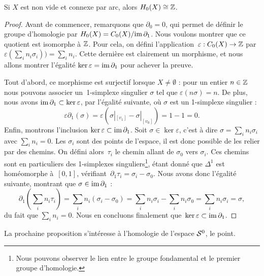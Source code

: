 \begin{proposition}
Si $X$ est non vide et connexe par arc, alors $H_0(X)\cong\mathbb{Z}$.
\end{proposition}
\begin{proof}
Avant de commencer, remarquons que $\partial_0=0$, qui permet de définir le groupe d'homologie par $H_0(X)=C_0(X)/\mathrm{im}\,\partial_1$. Nous voulons montrer que ce quotient est isomorphe à $\mathbb{Z}$. Pour cela, on défini l'application~${\varepsilon:C_0(X)\to \mathbb{Z}}$ par $\varepsilon(\sum_in_i\sigma_i))=\sum_in_i$. Cette dernière est clairement un morphisme, et nous allons montrer l'égalité $\ker\varepsilon=\mathrm{im}\,\partial_1$ pour achever la preuve.

Tout d'abord, ce morphisme est surjectif lorsque $X\neq\emptyset$ : pour un entier $n\in \mathbb{Z}$ nous pouvons associer un~1-simplexe singulier $\sigma$ tel que $\varepsilon(n\sigma)=n$. De plus, nous avons $\mathrm{im}\,\partial_1\subset\ker\varepsilon$, par l'égalité suivante, où $\sigma$ est un 1-simplexe singulier : \[\varepsilon\partial_1(\sigma)=\varepsilon(\sigma|_{[v_1]}-\sigma|_{[v_0]})=1-1=0.\]
Enfin, montrons l'inclusion $\ker\varepsilon\subset\mathrm{im}\,\partial_1$. Soit $\sigma\in \ker\varepsilon$, c'est à dire $\sigma=\sum_in_i\sigma_i$ avec $\sum_in_i=0$. Les $\sigma_i$ sont des points de l'espace, il est donc possible de les relier par des chemins. On défini alors~$\tau_i$ le chemin allant de $\sigma_0$ vers $\sigma_i$. Ces chemins sont en particuliers des 1-simplexes singuliers\footnote{Nous pouvons observer le lien entre le groupe fondamental et le premier groupe d'homologie.}, étant donné que $\Delta^1$ est homéomorphe à~$[0,1]$, vérifiant~$\partial_1\tau_i=\sigma_i-\sigma_0$. Nous avons donc l'égalité suivante, montrant que $\sigma\in\mathrm{im}\,\partial_1$ :\[\partial_1\left(\sum_in_i\tau_i\right)=\sum_in_i(\sigma_i-\sigma_0)=\sum_in_i\sigma_i-\sum_in_i\sigma_0=\sum_in_i\sigma_i=\sigma,\]du fait que $\sum_in_i=0$. Nous en concluons finalement que~${\ker\varepsilon\subset\mathrm{im}\,\partial_1}$.
\end{proof}

La prochaine proposition s'intéresse à l'homologie de l'espace $\mathcal{S}^{0}$, le point.

